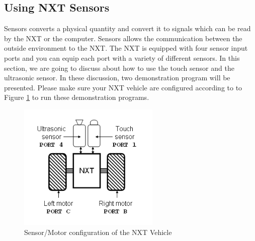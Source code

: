 \documentclass[11pt]{article}
\begin{document}
\subsection{Using NXT Sensors}
Sensors converts a physical quantity and convert it to signals which can be read by the NXT or the computer. 
Sensors allows the communication between the outside environment to the NXT. The NXT is equipped with four 
sensor input ports and you can equip each port with a variety of different sensors. In this section, we are 
going to discuss about how to use the touch sensor and the ultrasonic sensor. In these discussion, two 
demonstration program will be presented. Please make sure your NXT vehicle are configured according to to 
Figure \ref{fig_NXT_sensport} to run these demonstration programs.
\begin{figure}[H]
  \begin{center}
    \includegraphics[height=2.4in]{figure/mindstorm/NXT_auto.png}
    \caption{Sensor/Motor configuration of the NXT Vehicle \label{fig_NXT_sensport}}
  \end{center}
\end{figure}
\end{document}
